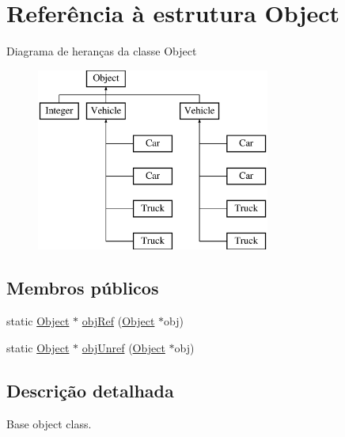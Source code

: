 \hypertarget{struct_object}{\section{Referência à estrutura Object}
\label{struct_object}
}
Diagrama de heranças da classe Object\begin{figure}[H]
\begin{center}
\leavevmode
\includegraphics[height=6.000000cm]{struct_object}
\end{center}
\end{figure}
\subsection*{Membros públicos}
\begin{DoxyCompactItemize}
\item 
static \hyperlink{struct_object}{Object} $\ast$ \hyperlink{struct_object_a71225073d06a793b9a6ea9263ed37b12}{obj\-Ref} (\hyperlink{struct_object}{Object} $\ast$obj)
\item 
static \hyperlink{struct_object}{Object} $\ast$ \hyperlink{struct_object_a924ee0cecc906d148022b3f0d6325cfb}{obj\-Unref} (\hyperlink{struct_object}{Object} $\ast$obj)
\end{DoxyCompactItemize}


\subsection{Descrição detalhada}
Base object class. 


